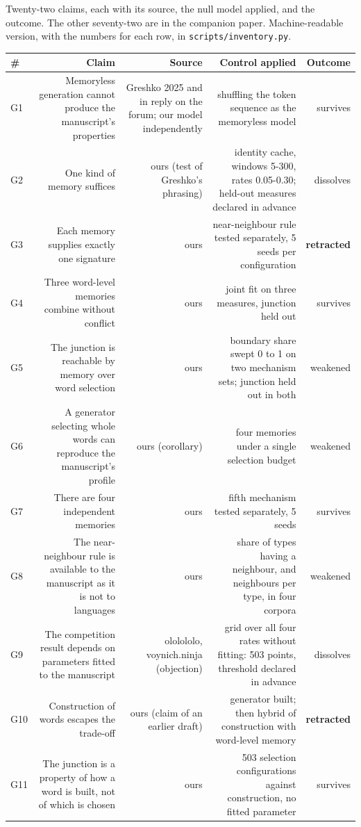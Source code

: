 \documentclass[11pt,a4paper]{article}
\begin{document}
Twenty-two claims, each with its source, the null model applied, and the outcome. The other seventy-two are in the companion paper. Machine-readable version, with the numbers for each row, in \texttt{scripts/inventory.py}.


\begin{table}[htbp]\centering\small
\begin{tabular}{@{}lrrrr@{}}
\toprule
\# & Claim & Source & Control applied & Outcome \\
\midrule
G1 & Memoryless generation cannot produce the manuscript's properties & Greshko 2025 and in reply on the forum; our model independently & shuffling the token sequence as the memoryless model & survives \\
G2 & One kind of memory suffices & ours (test of Greshko's phrasing) & identity cache, windows 5-300, rates 0.05-0.30; held-out measures declared in advance & dissolves \\
G3 & Each memory supplies exactly one signature & ours & near-neighbour rule tested separately, 5 seeds per configuration & \textbf{retracted} \\
G4 & Three word-level memories combine without conflict & ours & joint fit on three measures, junction held out & survives \\
G5 & The junction is reachable by memory over word selection & ours & boundary share swept 0 to 1 on two mechanism sets; junction held out in both & weakened \\
G6 & A generator selecting whole words can reproduce the manuscript's profile & ours (corollary) & four memories under a single selection budget & weakened \\
G7 & There are four independent memories & ours & fifth mechanism tested separately, 5 seeds & survives \\
G8 & The near-neighbour rule is available to the manuscript as it is not to languages & ours & share of types having a neighbour, and neighbours per type, in four corpora & weakened \\
G9 & The competition result depends on parameters fitted to the manuscript & ololololo, voynich.ninja (objection) & grid over all four rates without fitting: 503 points, threshold declared in advance & dissolves \\
G10 & Construction of words escapes the trade-off & ours (claim of an earlier draft) & generator built; then hybrid of construction with word-level memory & \textbf{retracted} \\
G11 & The junction is a property of how a word is built, not of which is chosen & ours & 503 selection configurations against construction, no fitted parameter & survives \\

\end{tabular}
\end{table}
\end{document}
